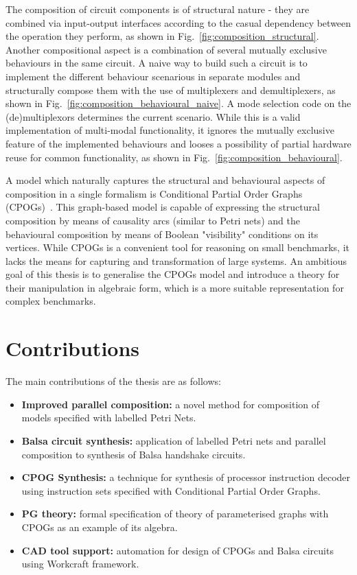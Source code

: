 The composition of circuit components is of structural nature - they are combined via input-output interfaces according to the casual dependency between the operation they perform, as shown in Fig.~\ref{fig:composition_structural}.
Another compositional aspect is a combination of several mutually exclusive behaviours in the same circuit. A naive way to build such a circuit is to implement the different behaviour scenarious in separate modules and structurally compose them with the use of multiplexers and demultiplexers, as shown in Fig.~\ref{fig:composition_behavioural_naive}. A mode selection code on the (de)multiplexors determines the current scenario.  While this is a valid implementation of multi-modal functionality, it ignores the mutually exclusive feature of the implemented behaviours and looses a possibility of partial hardware reuse for common functionality, as shown in Fig.~\ref{fig:composition_behavioural}. 

A model which naturally captures the structural and behavioural aspects of composition in a single formalism is Conditional Partial Order Graphs (CPOGs)~\cite{2009_mokhov_phd}. This graph-based model is capable of expressing the structural composition by means of causality arcs (similar to Petri nets) and the behavioural composition by means of Boolean "visibility" conditions on its vertices. While CPOGs is a convenient tool for reasoning on small benchmarks, it lacks the means for capturing and transformation of large systems. An ambitious goal of this thesis is to generalise the CPOGs model and introduce a theory for their manipulation in algebraic form, which is a more suitable representation for complex benchmarks.

\section{Contributions}

The main contributions of the thesis are as follows:

\begin{itemize}
\item
\textbf{Improved parallel composition:} a novel method for composition of models specified with labelled Petri Nets.

\item
\textbf{Balsa circuit synthesis:} application of labelled Petri nets and parallel composition to synthesis of Balsa handshake circuits.

\item
\textbf{CPOG Synthesis:} a technique for synthesis of processor instruction decoder using instruction sets specified with Conditional Partial Order Graphs.

\item
\textbf{PG theory:} formal specification of theory of parameterised graphs with CPOGs as an example of its algebra.

\item
\textbf{CAD tool support:} automation for design of CPOGs and Balsa circuits using Workcraft framework.

\end{itemize}

